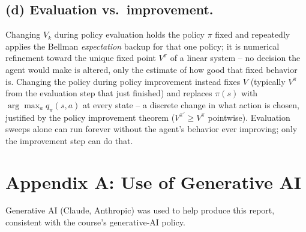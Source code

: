 \documentclass[11pt]{article}
\begin{document}
\subsection*{(d) Evaluation vs.\ improvement.}
Changing $V_k$ during policy evaluation holds the policy $\pi$ fixed and
repeatedly applies the Bellman \emph{expectation} backup for that one policy;
it is numerical refinement toward the unique fixed point $V^\pi$ of a linear
system -- no decision the agent would make is altered, only the estimate of
how good that fixed behavior is. Changing the policy during policy
improvement instead fixes $V$ (typically $V^\pi$ from the evaluation step
that just finished) and replaces $\pi(s)$ with $\arg\max_a q_\pi(s,a)$ at
every state -- a discrete change in what action is chosen, justified by the
policy improvement theorem ($V^{\pi'} \ge V^\pi$ pointwise). Evaluation
sweeps alone can run forever without the agent's behavior ever improving;
only the improvement step can do that.

\section*{Appendix A: Use of Generative AI}

Generative AI (Claude, Anthropic) was used to help produce this report,
consistent with the course's generative-AI policy.
\end{document}
